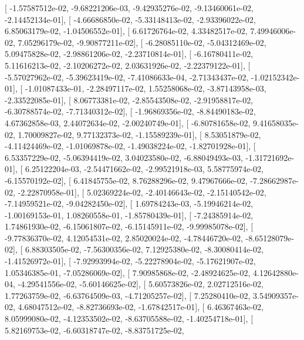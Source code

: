 \documentclass{article}
\begin{document}
       [ -1.57587512e-02,  -9.68221206e-03,  -9.42935276e-02,
         -9.13460061e-02,  -2.14452134e-01],
       [ -4.66686850e-02,  -5.33148413e-02,  -2.93396022e-02,
          6.85063179e-02,  -1.04506552e-01],
       [  6.61726764e-02,   4.33482517e-02,   7.49946006e-02,
          7.05296179e-02,  -9.90877211e-02],
       [ -6.28085110e-02,  -5.04312469e-02,   5.09475828e-02,
         -2.98861206e-02,  -2.23710814e-01],
       [ -6.16780411e-02,   5.11616213e-02,  -2.10206272e-02,
          2.03631926e-02,  -2.22379122e-01],
       [ -5.57027962e-02,  -5.39623419e-02,  -7.41086633e-04,
         -2.71343437e-02,  -1.02152342e-01],
       [ -1.01087433e-01,  -2.28497117e-02,   1.55258068e-02,
         -3.87143958e-03,  -2.33522085e-01],
       [  8.06773381e-02,  -2.85543508e-02,  -2.91958817e-02,
         -6.30788574e-02,  -7.71340312e-02],
       [ -1.96869356e-02,  -8.84490183e-02,   4.67362858e-03,
          2.44072634e-02,  -2.00240749e-01],
       [ -6.80781658e-02,   9.41658035e-02,   1.70009827e-02,
          9.77132373e-02,  -1.15589239e-01],
       [  8.53051879e-02,  -4.11424469e-02,  -1.01069878e-02,
         -1.49038224e-02,  -1.82701928e-01],
       [  6.53357229e-02,  -5.06394419e-02,   3.04023580e-02,
         -6.88049493e-03,  -1.31721692e-01],
       [  6.25122204e-03,  -2.54471662e-02,  -2.99521918e-03,
          5.58775974e-02,  -6.15570192e-02],
       [  6.41845755e-02,   8.76288296e-02,   9.47967666e-02,
         -7.28662987e-02,  -2.22870958e-01],
       [  5.02369224e-02,  -2.40146643e-02,  -2.15140542e-02,
         -7.14959521e-02,  -9.04282450e-02],
       [  1.69784243e-03,  -5.19946214e-02,  -1.00169153e-01,
          1.08260558e-01,  -1.85780439e-01],
       [ -7.24385914e-02,   1.74861930e-02,  -6.15061807e-02,
         -6.15145911e-02,  -9.99985078e-02],
       [ -9.77836370e-02,   4.12054531e-02,   2.85020024e-02,
         -4.78446720e-02,  -8.65128079e-02],
       [  6.88303505e-02,  -7.56300356e-02,   7.12925380e-02,
         -8.30080414e-02,  -1.41526972e-01],
       [ -7.92993994e-02,  -5.22278904e-02,  -5.17621907e-02,
          1.05346385e-01,  -7.05286069e-02],
       [  7.90985868e-02,  -2.48924625e-02,   4.12642880e-04,
         -4.29541556e-02,  -5.60146625e-02],
       [  5.60573826e-02,   2.02712516e-02,   1.77263759e-02,
         -6.63764509e-03,  -4.71205257e-02],
       [  7.25280410e-02,   3.54909357e-02,   4.68047512e-02,
         -8.82736693e-02,  -1.67842517e-01],
       [  6.46367463e-02,   8.05999080e-02,  -4.12353502e-02,
         -8.63705588e-02,  -1.40254718e-01],
       [  5.82169753e-02,  -6.60318747e-02,  -8.83751725e-02,
\end{document}

